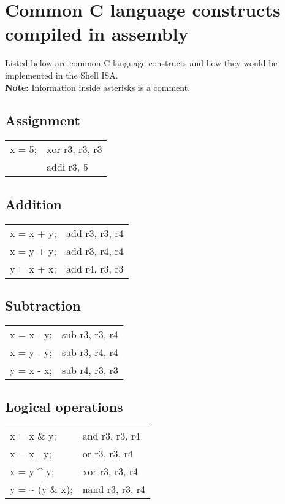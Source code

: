 \documentclass{article}
\begin{document}
\section{Common C language constructs compiled in assembly}
Listed below are common C language constructs and how they would be implemented in the Shell ISA. \\
\textbf{Note:} Information inside asterisks is a comment. 
\label{commonC}
\begin{par}
	
	\subsection{Assignment}
	\begin{center}
		\begin{tabular}{|l|l|}
			\hline
			x = 5; & xor r3, r3, r3 \\
			& addi r3, 5 \\
			\hline
		\end{tabular}
	\end{center}

	\subsection{Addition}
	\begin{center}
		\begin{tabular}{|l|l|}
			\hline
			x = x + y; & add r3, r3, r4 \\
			x = y + y; & add r3, r4, r4 \\
			y = x + x; & add r4, r3, r3 \\
			\hline
		\end{tabular}
	\end{center}

	\subsection{Subtraction}
	\begin{center}
		\begin{tabular}{|l|l|}
			\hline
			x = x - y; & sub r3, r3, r4 \\
			x = y - y; & sub r3, r4, r4 \\
			y = x - x; & sub r4, r3, r3 \\
			\hline
		\end{tabular}
	\end{center}
	
	\subsection{Logical operations}
	\begin{center}
		\begin{tabular}{|l|l|}
			\hline
			x = x \& y; & and r3, r3, r4 \\
			x = x $ \vert $ y; & or r3, r3, r4 \\
			x = y \^{} y; & xor r3, r3, r4 \\
			y = \~{} (y \& x); & nand r3, r3, r4 \\
			\hline
		\end{tabular}
	\end{center}


\end{par}
\end{document}

